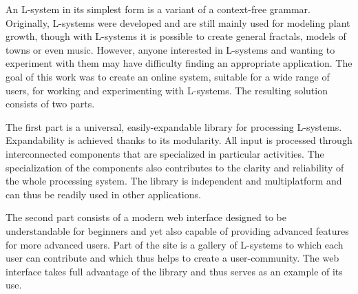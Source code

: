 \documentclass[12pt,a4paper]{report}
\newcommand{\lsystem}{\mbox{L-system}\xspace}
\newcommand{\lsystems}{\mbox{L-systems}\xspace}
\begin{document}
\pagestyle{empty}

An \lsystem in its simplest form is a variant of a context-free grammar.
Originally, \lsystems were developed and are still mainly used for modeling plant growth, though with \lsystems it is possible to create general fractals, models of towns or even music.
However, anyone interested in \lsystems and wanting to experiment with them may have difficulty finding an appropriate application.
The goal of this work was to create an online system, suitable for a wide range of users, for working and experimenting with \lsystems.
The resulting solution consists of two parts.

The first part is a universal, easily-expandable library for processing \mbox{L-sys}\-tems.
Expandability is achieved thanks to its modularity.
All input is processed through interconnected components that are specialized in particular activities.
The specialization of the components also contributes to the clarity and reliability of the whole processing system.
The library is independent and multiplatform and can thus be readily used in other applications.

The second part consists of a modern web interface designed to be understandable for beginners and yet also capable of providing advanced features for more advanced users.
Part of the site is a gallery of \lsystems to which each user can contribute and which thus helps to create a user-community.
The web interface takes full advantage of the library and thus serves as an example of its use.
\end{document}

